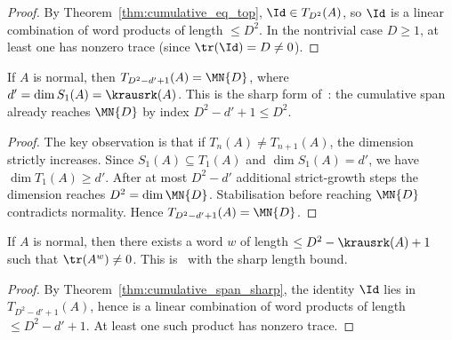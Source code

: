 \begin{proof}
    \leanok
    By Theorem~\ref{thm:cumulative_eq_top},
    $\Id \in T_{D^2}(A)$,
    so $\Id$ is a linear combination of word products
    of length $\le D^2$.
    In the nontrivial case $D \ge 1$, at least one has nonzero trace
    (since $\tr(\Id) = D \neq 0$).
\end{proof}

\begin{theorem}%
    \label{thm:cumulative_span_sharp}
    \leanok
    If $A$ is normal, then
    $T_{D^2 - d' + 1}(A) = \MN{D}$,
    where $d' = \dim S_1(A) = \krausrk(A)$.
    This is the sharp form of~\cite[Lemma~1]{Sanz2010Quantum}:
    the cumulative span already reaches $\MN{D}$ by index
    $D^2 - d' + 1 \le D^2$.
\end{theorem}

\begin{proof}
    \leanok
    The key observation is that if $T_n(A) \neq T_{n+1}(A)$,
    the dimension strictly increases.
    Since $S_1(A) \subseteq T_1(A)$ and $\dim S_1(A) = d'$,
    we have $\dim T_1(A) \ge d'$.
    After at most $D^2 - d'$ additional strict-growth steps
    the dimension reaches $D^2 = \dim \MN{D}$.
    Stabilisation before reaching $\MN{D}$ contradicts normality.
    Hence $T_{D^2 - d' + 1}(A) = \MN{D}$.
\end{proof}

\begin{theorem}%
    \label{thm:nonzero_trace_word_sharp}
    \leanok
    If $A$ is normal, then there exists a word $w$ of length
    $\le D^2 - \krausrk(A) + 1$ such that
    $\tr(A^w) \neq 0$.
    This is~\cite[Lemma~1]{Sanz2010Quantum} with the sharp
    length bound.
\end{theorem}

\begin{proof}
    \leanok
    By Theorem~\ref{thm:cumulative_span_sharp},
    the identity $\Id$ lies in $T_{D^2 - d' + 1}(A)$,
    hence is a linear combination of word products of length
    $\le D^2 - d' + 1$.
    At least one such product has nonzero trace.
\end{proof}

